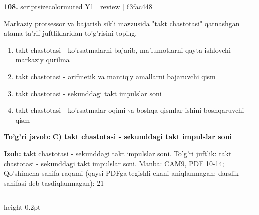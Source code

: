 \documentclass[10pt,a4paper]{article}
\begin{document}
{\bfseries\sffamily\color{ink} 108.} {scriptsizecolor{muted} Y1 | review | 63fac448}
\par
Markaziy protsessor va bajarish sikli mavzusida "takt chastotasi" qatnashgan atama-ta'rif juftliklaridan to'g'risini toping.
\begin{enumerate}[label=\Alph*),leftmargin=9mm]
\item takt chastotasi - ko'rsatmalarni bajarib, ma'lumotlarni qayta ishlovchi markaziy qurilma
\item takt chastotasi - arifmetik va mantiqiy amallarni bajaruvchi qism
\item takt chastotasi - sekunddagi takt impulslar soni
\item takt chastotasi - ko'rsatmalar oqimi va boshqa qismlar ishini boshqaruvchi qism
\end{enumerate}
\begin{tcolorbox}[enhanced,breakable,colback=teal!4,colframe=teal!60!black,boxrule=0.45pt,arc=1.2mm,left=2.7mm,right=2.7mm,top=1.8mm,bottom=1.8mm,before skip=2mm,after skip=2mm]
{\bfseries\sffamily\color{teal}To'g'ri javob:} \textbf{C) takt chastotasi - sekunddagi takt impulslar soni}
\par\smallskip
{\bfseries Izoh:} takt chastotasi - sekunddagi takt impulslar soni. To'g'ri juftlik: takt chastotasi - sekunddagi takt impulslar soni. Manba: CAM9, PDF 10-14; Qo'shimcha sahifa raqami (qaysi PDFga tegishli ekani aniqlanmagan; darslik sahifasi deb tasdiqlanmagan): 21
\end{tcolorbox}
\vspace{2mm}\hrule height 0.2pt\vspace{3mm}
\end{document}
